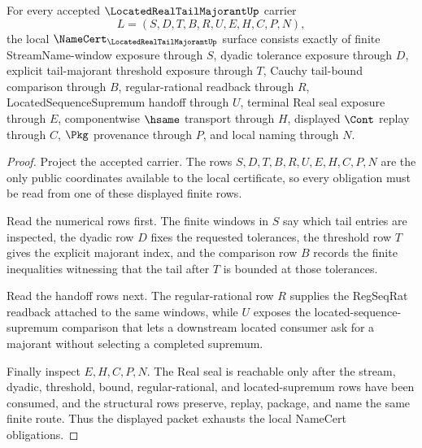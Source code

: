 \begin{theorem}
\label{thm:located-real-tail-majorant-namecert-obligations}
For every accepted $\LocatedRealTailMajorantUp$ carrier
$$
L=(S,D,T,B,R,U,E,H,C,P,N),
$$
the local $\NameCert_{\LocatedRealTailMajorantUp}$ surface consists exactly of finite StreamName-window exposure through $S$, dyadic tolerance exposure through $D$, explicit tail-majorant threshold exposure through $T$, Cauchy tail-bound comparison through $B$, regular-rational readback through $R$, LocatedSequenceSupremum handoff through $U$, terminal Real seal exposure through $E$, componentwise $\hsame$ transport through $H$, displayed $\Cont$ replay through $C$, $\Pkg$ provenance through $P$, and local naming through $N$.
\end{theorem}
\begin{proof}
Project the accepted carrier. The rows $S,D,T,B,R,U,E,H,C,P,N$ are the only public coordinates available to the local certificate, so every obligation must be read from one of these displayed finite rows.

Read the numerical rows first. The finite windows in $S$ say which tail entries are inspected, the dyadic row $D$ fixes the requested tolerances, the threshold row $T$ gives the explicit majorant index, and the comparison row $B$ records the finite inequalities witnessing that the tail after $T$ is bounded at those tolerances.

Read the handoff rows next. The regular-rational row $R$ supplies the RegSeqRat readback attached to the same windows, while $U$ exposes the located-sequence-supremum comparison that lets a downstream located consumer ask for a majorant without selecting a completed supremum.

Finally inspect $E,H,C,P,N$. The Real seal is reachable only after the stream, dyadic, threshold, bound, regular-rational, and located-supremum rows have been consumed, and the structural rows preserve, replay, package, and name the same finite route. Thus the displayed packet exhausts the local NameCert obligations.
\end{proof}

